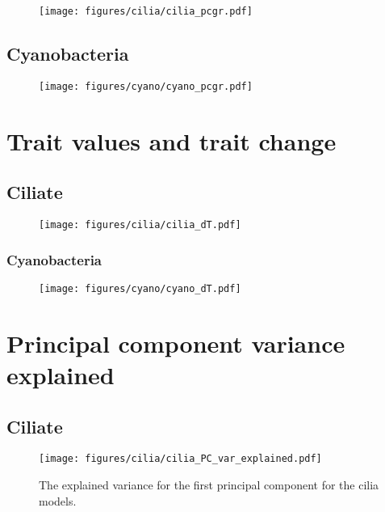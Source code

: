 \begin{figure}[H]
    \centering
    \texttt{[image: figures/cilia/cilia\_pcgr.pdf]}
    \caption{}
    \label{fig:cilia_pcgr}
\end{figure}

\subsection{Cyanobacteria}

\begin{figure}[H]
    \centering
    \texttt{[image: figures/cyano/cyano\_pcgr.pdf]}
    \caption{}
    \label{fig:cyano_pcgr}
\end{figure}

\section{Trait values and trait change}

\subsection{Ciliate}

\begin{figure}[H]
    \centering
    \texttt{[image: figures/cilia/cilia\_dT.pdf]}
    \caption{}
    \label{fig:cilia_dT}
\end{figure}

\subsubsection{Cyanobacteria}

\begin{figure}[H]
    \centering
    \texttt{[image: figures/cyano/cyano\_dT.pdf]}
    \caption{}
    \label{fig:cyano_dT}
\end{figure}

\section{Principal component variance explained}

\subsection{Ciliate}

\begin{figure}[H]
    \centering
    \texttt{[image: figures/cilia/cilia\_PC\_var\_explained.pdf]}
    \caption{The explained variance for the first principal component for the cilia models.}
    \label{fig:cilia_PC_var_explained}
\end{figure}

